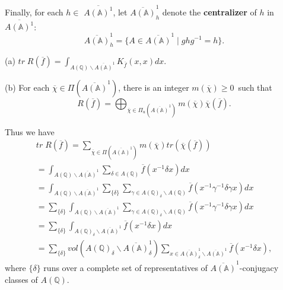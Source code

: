 Finally, for each $h\in $ $\overline{A({\mathbb{A}})^1}$, let
$\overline{A({\mathbb{A}})}_h^1$ denote the \textbf{centralizer} of $h$
in $\overline{A({\mathbb{A}})^1}$: 
\begin{equation}
\overline{A({\mathbb{A}})}_h^1
=\{A\in \overline{A({\mathbb{A}})}^1\;|\;ghg^{-1}=h\}.
\end{equation}

\begin{theorem}
(a) $tr\;R(\overline{f})
=\int_{A({\mathbb{Q}})\backslash \overline{A({\mathbb{A}})}^1}
K_{\overline{f}}(x,x)dx.$

(b) For each $\overline{\chi }\in \Pi (\overline{A({\mathbb{A}})}^1)$, there is
an integer $m(\overline{\chi })\geq 0$\ such that 
\[
R(\overline{f})
=\bigoplus_{\overline{\chi }\in \Pi_u (\overline{A({\mathbb{A}})}^1)}
m(\overline{\chi })\overline{\chi }(\overline{f}).
\]
\end{theorem}

Thus we have 
\begin{equation}
\begin{array}{c}
tr\;R(\overline{f})
=\sum_{\overline{\chi }\in \Pi (\overline{A({\mathbb{A}})}^1)}
m(\overline{\chi })tr(\overline{\chi }(\overline{f})) \\ 
=\int_{A({\mathbb{Q}})\backslash \overline{A({\mathbb{A}})}^1}
\sum_{\delta\in A({\mathbb{Q}})}
\overline{f}(x^{-1}\delta x)dx \\ 
=\int_{A({\mathbb{Q}})\backslash \overline{A({\mathbb{A}})}^1}
\sum_{\{\delta \}}
\sum_{\gamma \in A({\mathbb{Q}})_\delta\backslash A({\mathbb{Q}})}
\overline{f}(x^{-1}\gamma ^{-1}\delta \gamma x)dx \\ 
=\sum_{\{\delta \}}
\int_{A({\mathbb{Q}})\backslash \overline{A({\mathbb{A}})}^1}
\sum_{\gamma \in A({\mathbb{Q}})_\delta \backslash A({\mathbb{Q}})}
\overline{f}(x^{-1}\gamma ^{-1}\delta \gamma x)dx \\ 
=\sum_{\{\delta \}}
\int_{A({\mathbb{Q}})_\delta \backslash \overline{A({\mathbb{A}})}^1}
\overline{f}(x^{-1}\delta x)dx \\ 
=\sum_{\{\delta \}}
vol(A({\mathbb{Q}})_\delta \backslash \overline{A({\mathbb{A}})}_\delta ^1)
\sum_{x\in \overline{A({\mathbb{A}})}_\delta ^1
\backslash \overline{A({\mathbb{A}})}^1}
\overline{f}(x^{-1}\delta x),
\end{array}
\end{equation}
where $\{\delta \}$ runs over a complete set of representatives of
$\overline{A({\mathbb{A}})}^1$-conjugacy classes of $A({\mathbb{Q}})$.


